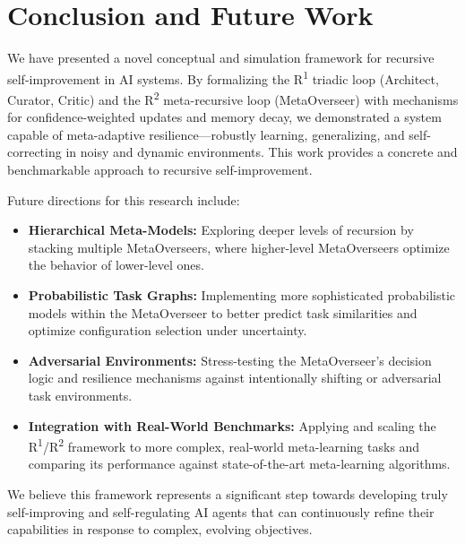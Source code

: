 \documentclass{article}
\begin{document}
\section{Conclusion and Future Work}
We have presented a novel conceptual and simulation framework for recursive self-improvement in AI systems. By formalizing the R\textsuperscript{1} triadic loop (Architect, Curator, Critic) and the R\textsuperscript{2} meta-recursive loop (MetaOverseer) with mechanisms for confidence-weighted updates and memory decay, we demonstrated a system capable of meta-adaptive resilience—robustly learning, generalizing, and self-correcting in noisy and dynamic environments. This work provides a concrete and benchmarkable approach to recursive self-improvement.

Future directions for this research include:
\begin{itemize}
    \item \textbf{Hierarchical Meta-Models:} Exploring deeper levels of recursion by stacking multiple MetaOverseers, where higher-level MetaOverseers optimize the behavior of lower-level ones.
    \item \textbf{Probabilistic Task Graphs:} Implementing more sophisticated probabilistic models within the MetaOverseer to better predict task similarities and optimize configuration selection under uncertainty.
    \item \textbf{Adversarial Environments:} Stress-testing the MetaOverseer's decision logic and resilience mechanisms against intentionally shifting or adversarial task environments.
    \item \textbf{Integration with Real-World Benchmarks:} Applying and scaling the R\textsuperscript{1}/R\textsuperscript{2} framework to more complex, real-world meta-learning tasks and comparing its performance against state-of-the-art meta-learning algorithms.
\end{itemize}
We believe this framework represents a significant step towards developing truly self-improving and self-regulating AI agents that can continuously refine their capabilities in response to complex, evolving objectives.

\end{document}
